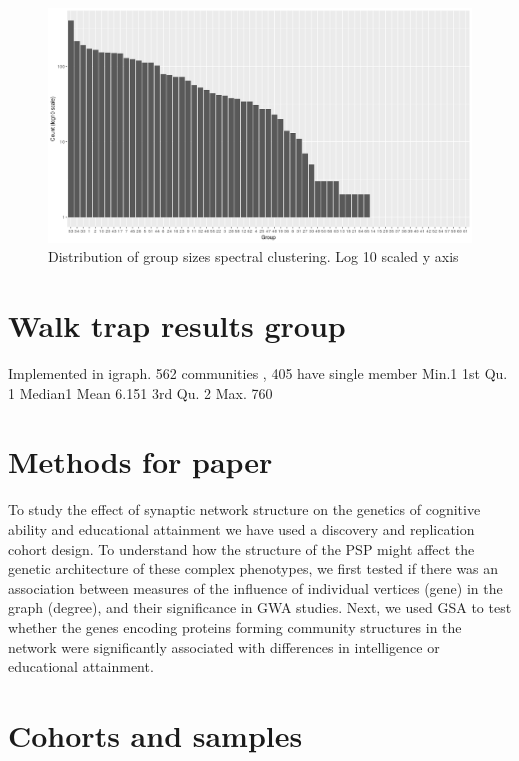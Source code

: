 \begin{figure}
    \centering
    \includegraphics[width=\textwidth]{images/Rplot_spectral_groups_size_log10.png}
    \caption{Distribution of group sizes spectral clustering. Log 10 scaled y axis}
    \label{fig:group sizes spectral clustering log 10}
\end{figure}


\section{Walk trap results group}
\label{sec:walk trap results}
Implemented in igraph. 562 communities , 405 have single member  Min.1 1st Qu.  1 Median1    Mean 6.151 3rd Qu. 2   Max. 760 
 
\section{Methods for paper}
\label{sec: community detection methods from paper}
To study the effect of synaptic network structure on the genetics of cognitive ability and educational attainment we have used a discovery and replication cohort design. To understand how the structure of the PSP might affect the genetic architecture of these complex phenotypes, we first tested if there was an association between measures of the influence of individual vertices (gene) in the graph (degree), and their significance in GWA studies. 
Next, we used GSA to test whether the genes encoding proteins forming community structures in the network were significantly associated with differences in intelligence or educational attainment. 


\section{Cohorts and samples}

